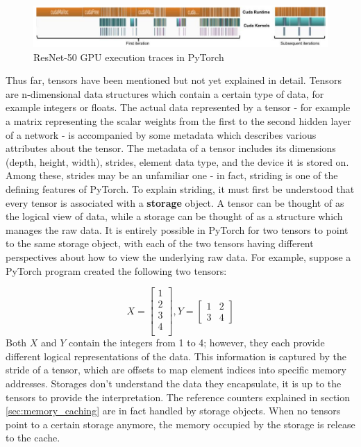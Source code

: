 \documentclass[12pt,letterpaper]{article}
\begin{document}
\begin{figure}[ht]
\centering
\includegraphics[width=.9\textwidth]{cuda_kernel_caching.png}
\captionsetup{width=0.7\linewidth}
\caption{ResNet-50 GPU execution traces in PyTorch \cite{pytorch_paper}}
\label{fig:cuda_memory_kernels}
\end{figure}

 
%
%

\label{sec:tensors_in_pytorch}
Thus far, tensors have been mentioned but not yet explained in detail. Tensors are n-dimensional data structures which contain a certain type of data, for example integers or floats. The actual data represented by a tensor - for example a matrix representing the scalar weights from the first to the second hidden layer of a network - is accompanied by some metadata which describes various attributes about the tensor. The metadata of a tensor includes its dimensions (depth, height, width), strides, element data type, and the device it is stored on. Among these, strides may be an unfamiliar one - in fact, striding is one of the defining features of PyTorch. To explain striding, it must first be understood that every tensor is associated with a \textbf{storage} object. A tensor can be thought of as the logical view of data, while a storage can be thought of as a structure which manages the raw data. It is entirely possible in PyTorch for two tensors to point to the same storage object, with each of the two tensors having different perspectives about how to view the underlying raw data. For example, suppose a PyTorch program created the following two tensors:

\[
X =
\begin{bmatrix}
    1      \\
    2      \\
    3      \\
    4      \\
\end{bmatrix} 
,
Y =
\begin{bmatrix}
    1  &  2      \\
    3  &  4      
\end{bmatrix} 
\]
Both $X$ and $Y$ contain the integers from 1 to 4; however, they each provide different logical representations of the data. This information is captured by the stride of a tensor, which are offsets to map element indices into specific memory addresses. Storages don't understand the data they encapsulate, it is up to the tensors to provide the interpretation. The reference counters explained in section \ref{sec:memory_caching} are in fact handled by storage objects. When no tensors point to a certain storage anymore, the memory occupied by the storage is release to the cache.  
\par 
\end{document}
